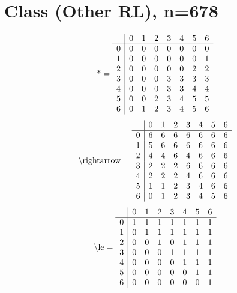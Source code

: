 \documentclass[11pt]{article}
\begin{document}
\section{Class (Other RL), n=678}
\[\text{*} = 
\begin{array}{r | r r r r r r r}
 & 0 & 1 & 2 & 3 & 4 & 5 & 6 \\ \hline
0 & 0 & 0 & 0 & 0 & 0 & 0 & 0 \\
1 & 0 & 0 & 0 & 0 & 0 & 0 & 1 \\
2 & 0 & 0 & 0 & 0 & 0 & 2 & 2 \\
3 & 0 & 0 & 0 & 3 & 3 & 3 & 3 \\
4 & 0 & 0 & 0 & 3 & 3 & 4 & 4 \\
5 & 0 & 0 & 2 & 3 & 4 & 5 & 5 \\
6 & 0 & 1 & 2 & 3 & 4 & 5 & 6 \\
\end{array}
\]
\[\text{\textbackslash rightarrow} = 
\begin{array}{r | r r r r r r r}
 & 0 & 1 & 2 & 3 & 4 & 5 & 6 \\ \hline
0 & 6 & 6 & 6 & 6 & 6 & 6 & 6 \\
1 & 5 & 6 & 6 & 6 & 6 & 6 & 6 \\
2 & 4 & 4 & 6 & 4 & 6 & 6 & 6 \\
3 & 2 & 2 & 2 & 6 & 6 & 6 & 6 \\
4 & 2 & 2 & 2 & 4 & 6 & 6 & 6 \\
5 & 1 & 1 & 2 & 3 & 4 & 6 & 6 \\
6 & 0 & 1 & 2 & 3 & 4 & 5 & 6 \\
\end{array}
\]
\[\text{\textbackslash le} = 
\begin{array}{r | r r r r r r r}
 & 0 & 1 & 2 & 3 & 4 & 5 & 6 \\ \hline
0 & 1 & 1 & 1 & 1 & 1 & 1 & 1 \\
1 & 0 & 1 & 1 & 1 & 1 & 1 & 1 \\
2 & 0 & 0 & 1 & 0 & 1 & 1 & 1 \\
3 & 0 & 0 & 0 & 1 & 1 & 1 & 1 \\
4 & 0 & 0 & 0 & 0 & 1 & 1 & 1 \\
5 & 0 & 0 & 0 & 0 & 0 & 1 & 1 \\
6 & 0 & 0 & 0 & 0 & 0 & 0 & 1 \\
\end{array}
\]
\end{document}
